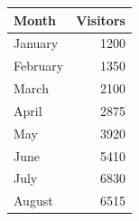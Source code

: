 \documentclass{article}
\begin{document}
\begin{longtable}{|l|r|}
\hline
Month & Visitors \\
\hline
\endhead
\hline
\endfoot
January & 1200 \\
February & 1350 \\
March & 2100 \\
April & 2875 \\
May & 3920 \\
June & 5410 \\
July & 6830 \\
August & 6515 \\
\end{longtable}
\end{document}
